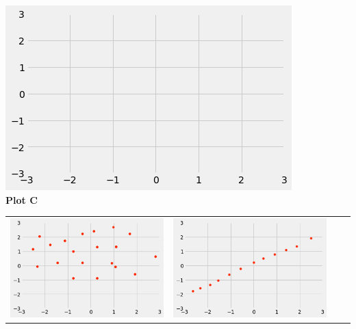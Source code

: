 \begin{enumerate}
{\begin{tabular}{l@{\hskip 1in}l@{\hskip 0.1in}l@{\hskip 0.1in}l}
    \end{tabular}
    \begin{center}
        \includegraphics[scale=.45]{figures/blankaxes.png}\\
        \textbf{Plot C}
    \end{center}
    }
    {
    \begin{tabular}{l@{\hskip 1in}l@{\hskip 0.1in}l@{\hskip 0.1in}l}
    \includegraphics[scale=.45]{figures/corr0soln.png}
    &\includegraphics[scale=.45]{figures/corr099soln.png}\\

\end{tabular}}
\end{enumerate}
